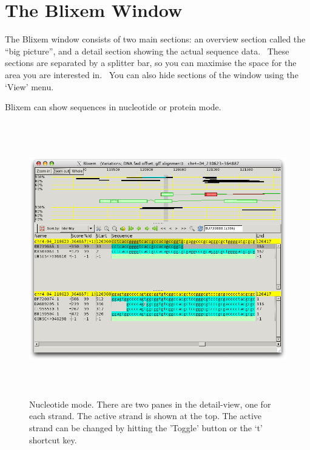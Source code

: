 \documentclass[letterpaper]{article}
\begin{document}
\clearpage
{\color[rgb]{0.0,0.27058825,0.5254902}\section[The Blixem Window]{The Blixem Window}}
{The Blixem window consists of two main sections: an overview section
called the {\textquotedblleft}big picture{\textquotedblright}, and a
detail section showing the actual sequence data. \ These sections are
separated by a splitter bar, so you can maximise the space for the area
you are interested in. \ You can also hide sections of the window using
the {\textquoteleft}View{\textquoteright} menu.}

\bigskip

{Blixem can show sequences in nucleotide or protein mode.}

\begin{figure}
\centering
\color[rgb]{0.30980393,0.5058824,0.7411765}
\includegraphics[width=15.231cm,height=11.972cm]{img_window_nucleotide_mode.png}
\caption{Nucleotide mode. There are two panes in the detail-view, one for each strand. 
The active strand is shown at the top. The active strand can be changed by hitting 
the {\textquoteright}Toggle{\textquoteright} button or the
 {\textquoteleft}t{\textquoteright} shortcut key.}
\end{figure}
\end{document}
